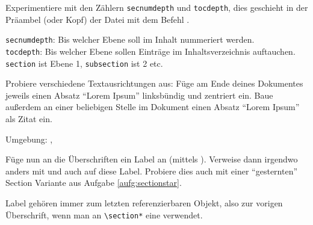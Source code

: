 \begin{uebung}
\item Experimentiere mit den Zählern \texttt{secnumdepth} und 
	\texttt{tocdepth}, dies geschieht in der Präambel (oder Kopf) der Datei mit dem
	Befehl . \label{zaehler}
	\begin{loesung}
	    \texttt{secnumdepth}: Bis welcher Ebene soll im Inhalt nummeriert werden.\\ 
	    \texttt{tocdepth}: Bis welcher Ebene sollen Einträge im Inhaltsverzeichnis auftauchen.\\
	    \texttt{section} ist Ebene 1, \texttt{subsection} ist 2 etc.
	\end{loesung}

\item Probiere verschiedene Textausrichtungen aus: Füge am Ende
    deines Dokumentes jeweils einen Absatz \enquote{Lorem Ipsum}
    linksbündig und zentriert ein. Baue außerdem an einer beliebigen Stelle
    im Dokument einen Absatz \enquote{Lorem Ipsum} als Zitat ein.
    \begin{loesung}
        Umgebung: , 
    \end{loesung}

\item Füge nun an die Überschriften ein Label an (mittels ).
    Verweise dann irgendwo anders mit  und auch
     auf diese Label. Probiere dies auch mit einer \enquote{gesternten}
    Section Variante aus Aufgabe \ref{aufg:sectionstar}.
    \begin{loesung}
        Label gehören immer zum letzten referenzierbaren Objekt, also zur vorigen Überschrift, wenn man an \verb|\section*| eine verwendet.
    \end{loesung}


\end{uebung}
